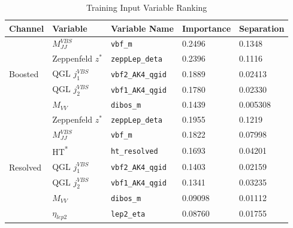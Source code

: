 \begin{table}[!ht]
  \centering
  \caption{Training Input Variable Ranking}
  \begin{tabular}{lllll}%
    \toprule
    Channel & Variable               & Variable Name        & Importance & Separation \\
    \midrule
    \multirow{5}{*}{Boosted}
            & \( M_{JJ}^{VBS} \)     & \verb|vbf_m|         & 0.2496     & 0.1348     \\
            & Zeppenfeld \( z^{*} \) & \verb|zeppLep_deta|  & 0.2396     & 0.1116     \\
            & QGL \( j_{1}^{VBS} \)  & \verb|vbf2_AK4_qgid| & 0.1889     & 0.02413    \\
            & QGL \( j_{2}^{VBS} \)  & \verb|vbf1_AK4_qgid| & 0.1780     & 0.02330    \\
            & \( M_{VV} \)           & \verb|dibos_m|       & 0.1439     & 0.005308   \\
    \midrule
    \multirow{7}{*}{Resolved}
            & Zeppenfeld \( z^{*} \) & \verb|zeppLep_deta|  & 0.1955     & 0.1219     \\
            & \( M_{JJ}^{VBS} \)     & \verb|vbf_m|         & 0.1822     & 0.07998    \\
            & HT\textsuperscript{*}  & \verb|ht_resolved|   & 0.1693     & 0.04201    \\
            & QGL \( j_{1}^{VBS} \)  & \verb|vbf2_AK4_qgid| & 0.1403     & 0.02159    \\
            & QGL \( j_{2}^{VBS} \)  & \verb|vbf1_AK4_qgid| & 0.1341     & 0.03235    \\
            & \( M_{VV} \)           & \verb|dibos_m|       & 0.09098    & 0.01112    \\
            & \( \eta_{lep2} \)      & \verb|lep2_eta|      & 0.08760    & 0.01755    \\
    \bottomrule
  \end{tabular}\label{tab:training-input-rank}
\end{table}


